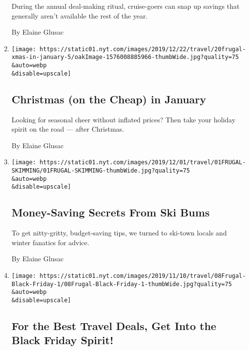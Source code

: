 \begin{enumerate}
  During the annual deal-making ritual, cruise-goers can snap up savings
  that generally aren't available the rest of the year.

  By Elaine Glusac
\item
  \href{/2019/12/20/travel/budget-travel-christmas-january.html}{}

  \texttt{[image: https://static01.nyt.com/images/2019/12/22/travel/20frugal-xmas-in-january-5/oakImage-1576008885966-thumbWide.jpg?quality=75\\\&auto=webp\\\&disable=upscale]}

  \hypertarget{christmas-on-the-cheap-in-january}{%
  \subsection{Christmas (on the Cheap) in
  January}\label{christmas-on-the-cheap-in-january}}

  Looking for seasonal cheer without inflated prices? Then take your
  holiday spirit on the road --- after Christmas.

  By Elaine Glusac
\item
  \href{/2019/11/29/travel/budget-skiing.html}{}

  \texttt{[image: https://static01.nyt.com/images/2019/12/01/travel/01FRUGAL-SKIMMING/01FRUGAL-SKIMMING-thumbWide.jpg?quality=75\\\&auto=webp\\\&disable=upscale]}

  \hypertarget{money-saving-secrets-from-ski-bums}{%
  \subsection{Money-Saving Secrets From Ski
  Bums}\label{money-saving-secrets-from-ski-bums}}

  To get nitty-gritty, budget-saving tips, we turned to ski-town locals
  and winter fanatics for advice.

  By Elaine Glusac
\item
  \href{/2019/11/08/travel/Black-Friday-Travel-Deals.html}{}

  \texttt{[image: https://static01.nyt.com/images/2019/11/10/travel/08Frugal-Black-Friday-1/08Frugal-Black-Friday-1-thumbWide.jpg?quality=75\\\&auto=webp\\\&disable=upscale]}

  \hypertarget{for-the-best-travel-deals-get-into-the-black-friday-spirit}{%
  \subsection{For the Best Travel Deals, Get Into the Black Friday
  Spirit!}\label{for-the-best-travel-deals-get-into-the-black-friday-spirit}}


\end{enumerate}

